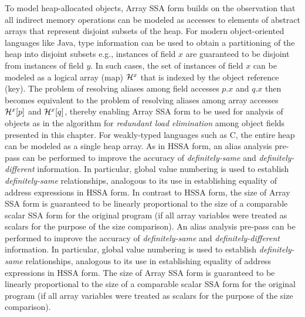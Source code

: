 To model heap-allocated objects, Array SSA form builds on the observation that all indirect memory operations can be modeled as accesses to elements of abstract arrays that represent disjoint subsets of the heap. 
For modern object-oriented languages like Java, type information can be used to obtain a partitioning of the heap into disjoint subsets e.g., instances of field $x$ are guaranteed to be disjoint from instances of field $y$. 
In such cases, the set of instances of field $x$ can be modeled as a logical array (map) ${\cal H}^x$ that is indexed by the object reference (key). 
The problem of resolving aliases among field accesses $p.x$ and $q.x$ then becomes equivalent to the problem of resolving aliases among array accesses ${\cal H}^x[p]$ and ${\cal H}^x[q]$, thereby enabling Array SSA form to be used for analysis of objects as in the algorithm for {\em redundant load elimination} among object fields presented in this chapter. 
For weakly-typed languages such as C, the entire heap can be modeled as a single heap array. 
\ifhssa
As in HSSA form, an alias analysis pre-pass can be performed to improve the accuracy of {\em definitely-same} and {\em definitely-different} information. 
In particular, global value numbering is used to establish {\em definitely-same} relationships, analogous to its use in establishing equality of address expressions in HSSA form. 
In contrast to HSSA form, the size of Array SSA form is guaranteed to be linearly proportional to the size of a comparable scalar SSA form for the original program (if all array variables were treated as scalars for the purpose of the size comparison).
\else
An alias analysis pre-pass can be performed to improve the accuracy of {\em definitely-same} and {\em definitely-different} information. 
In particular, global value numbering is used to establish {\em definitely-same} relationships, analogous to its use in establishing equality of address expressions in HSSA form. 
The size of Array SSA form is guaranteed to be linearly proportional to the size of a comparable scalar SSA form for the original program (if all array variables were treated as scalars for the purpose of the size comparison).
\fi


